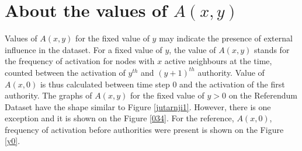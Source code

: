 \documentclass[times, utf8, zavrsni]{fer}
\begin{document}
\section{About the values of $A(x,y)$}
Values of $A(x, y)$ for the fixed value  of $y$ may indicate the presence of external influence in the dataset. For a fixed value of $y$, the value of $A(x,y)$ stands for the frequency of activation for nodes with $x$ active neighbours at the time, counted between the activation of $y^{th}$ and $(y+1)^{th}$  authority. Value of $A(x,0)$ is thus calculated between time step $0$ and the activation of the first authority. The graphs of $A(x,y)$ for the fixed value of $y > 0$ on the Referendum Dataset have the shape similar to Figure \ref{jutarnji1}. However, there is one exception and it is shown on the Figure \ref{034}. For the reference,  $A(x, 0)$, frequency of activation  before authorities were present is shown on the Figure \ref{y0}. 
\end{document}
